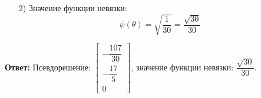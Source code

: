 \documentclass[a4paper]{article}
\begin{document}
\begin{enumerate}
\begin{enumerate}
        \item[2)] Значение функции невязки:  
            \[
            \psi(\theta) = \sqrt{\dfrac{1}{30}} = \dfrac{\sqrt{30}}{30}
            \]
           
    \end{enumerate}
    \textbf{Ответ:}  
    Псевдорешение: \(\begin{bmatrix} -\dfrac{107}{30} \\ -\dfrac{17}{5} \\ 0 \end{bmatrix}\), значение функции невязки: \(\dfrac{\sqrt{30}}{30}\).


\end{enumerate}
\end{document}
